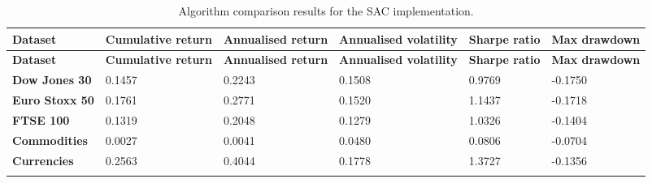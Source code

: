 \begin{longtable}{|l|p{2.1cm}|p{2.1cm}|p{2.1cm}|p{1.5cm}|p{2cm}|}
    \hline
    \textbf{Dataset} & \textbf{Cumulative return} & \textbf{Annualised return} & \textbf{Annualised volatility} & \textbf{Sharpe ratio} & \textbf{Max drawdown}  \\ \midrule
    \endfirsthead

    \hline
    \textbf{Dataset} & \textbf{Cumulative return} & \textbf{Annualised return} & \textbf{Annualised volatility} & \textbf{Sharpe ratio} & \textbf{Max drawdown}  \\ \midrule
    \endhead

    \endfoot
    \hline

    \textbf{Dow Jones 30} & 0.1457 & 0.2243 & 0.1508 & 0.9769 & -0.1750 \\ \hline
    \textbf{Euro Stoxx 50} & 0.1761 & 0.2771 & 0.1520 & 1.1437 & -0.1718 \\ \hline
    \textbf{FTSE 100} & 0.1319 & 0.2048 & 0.1279 & 1.0326 & -0.1404 \\ \hline
    \textbf{Commodities} & 0.0027 & 0.0041 & 0.0480 & 0.0806 & -0.0704 \\ \hline
    \textbf{Currencies} & 0.2563 & 0.4044 & 0.1778 & 1.3727 & -0.1356 \\ \hline

    \caption{Algorithm comparison results for the SAC implementation.}
    \label{tab:experiment_algorithms_sac}
\end{longtable}